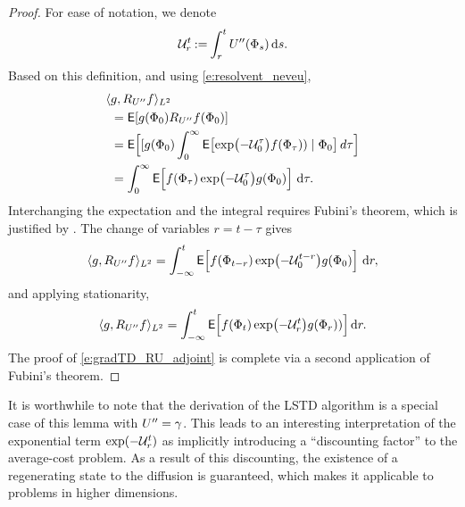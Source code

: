 \begin{proof}
	For ease of notation, we denote
	\begin{equation}
	{\cal U}_r^t \mathbin{:=} \int_{r}^{t} U''(\Phi_s) \,\textmd{d} s.
	\end{equation}
	Based on this definition,  and using \eqref{e:resolvent_neveu},  
	\begin{equation*}
	\begin{aligned}
	\langle &g, R_{U''}   f \rangle_{L^2}
	\\
	& ={\sf E}[g(\Phi_0)R_{U''}f(\Phi_0)]
	\\
	& = {\sf E}\Bigl[  [g(\Phi_0)\int_{0}^{\infty} {\sf E}\bigl[\exp\bigl(- {\cal U}_0^\tau  \bigr)f(\Phi_\tau)) \mid \Phi_0\bigr]\,d\tau \Bigr]
	\\
	& =\int_0^\infty {\sf E}\Bigl[ f(\Phi_\tau)  \exp\bigl(- {\cal U}_0^\tau  \bigr) g(\Phi_0) \Bigr]\, \,\textmd{d}\tau.
	\end{aligned}
	\end{equation*}
	Interchanging the expectation and the integral requires Fubini's theorem, which is justified by . The change of variables $r = t - \tau$ gives
	\begin{equation}
	\langle g, R_{U''} f \rangle_{L^2} =
	\int_{-\infty}^t  {\sf E}\Bigl[ f(\Phi_{t-r})  \exp \bigl(- {\cal U}_0^{t-r} \bigr) g(\Phi_0)\Bigr]\, \,\textmd{d} r,
	\end{equation}
	and applying stationarity,
	\begin{equation}
	\langle g, R_{U''} f \rangle_{L^2} =
	\int_{-\infty}^t {\sf E}\Bigl[ f(\Phi_t) \exp\bigl(- {\cal U}_r^t \bigr) g(\Phi_r))\Bigr] \,\textmd{d} r.
	\end{equation}
	The proof of \eqref{e:gradTD_RU_adjoint}
	is complete via a second application of Fubini's theorem.
\end{proof}

It is worthwhile to note that the derivation of the LSTD algorithm is a special case of this lemma with $U'' = \gamma$. This leads to an interesting interpretation of the exponential term $\exp(-{\cal U}_r^t)$ as implicitly introducing a ``discounting factor'' to the average-cost problem. As a result of this discounting, the existence of a regenerating state to the diffusion is guaranteed, which makes it applicable to problems in higher dimensions.  

